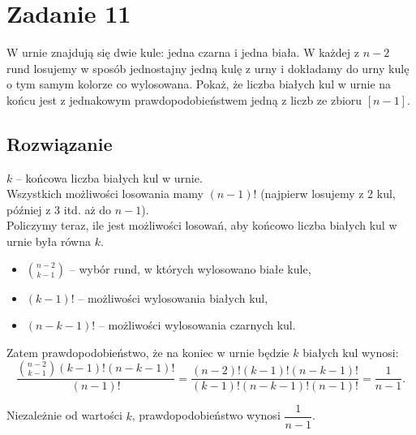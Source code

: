 \section{Zadanie 11}
W urnie znajdują się dwie kule: jedna czarna i jedna biała. W każdej z \(n-2\) rund losujemy w sposób jednostajny jedną kulę z urny i dokładamy do urny kulę o tym samym kolorze co wylosowana. Pokaż, że liczba białych kul w urnie na końcu jest z jednakowym prawdopodobieństwem jedną z liczb ze zbioru \([n-1].\)

\subsection*{Rozwiązanie}
\(k\) – końcowa liczba białych kul w urnie.\\[1em]

Wszystkich możliwości losowania mamy \((n-1)!\) (najpierw losujemy z 2 kul, później z 3 itd. aż do \(n-1\)).\\[1em]

Policzymy teraz, ile jest możliwości losowań, aby końcowo liczba białych kul w urnie była równa \(k\).\\[0.5em]

\begin{itemize}
	\item \(\displaystyle \binom{n-2}{k-1}\) – wybór rund, w których wylosowano białe kule,\\
	\item \((k-1)!\) – możliwości wylosowania białych kul,\\
	\item \((n-k-1)!\) – możliwości wylosowania czarnych kul.
\end{itemize}

Zatem prawdopodobieństwo, że na koniec w urnie będzie \(k\) białych kul wynosi:
\[
	\frac{\binom{n-2}{k-1} (k-1)! (n-k-1)!}{(n-1)!}
	= \frac{(n-2)! (k-1)! (n-k-1)!}{(k-1)! (n-k-1)! (n-1)!}
	= \frac{1}{n-1}.
\]

Niezależnie od wartości \(k\), prawdopodobieństwo wynosi \(\dfrac{1}{n-1}\).
